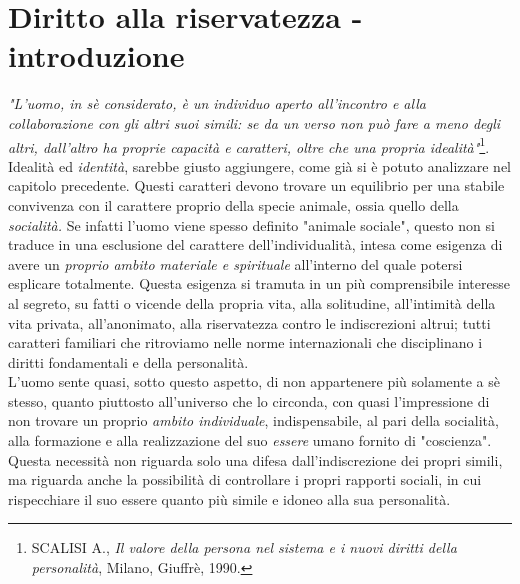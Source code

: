 


\section{Diritto alla riservatezza - introduzione}
\textit{"L'uomo, in sè considerato, è un individuo aperto all'incontro e alla collaborazione con gli altri suoi simili: se da un verso non può fare a meno degli altri, dall'altro ha proprie capacità e caratteri, oltre che una propria idealità"}\footnote{SCALISI A., \textit{Il valore della persona nel sistema e i nuovi diritti della personalità}, Milano, Giuffrè, 1990.}.
\\Idealità ed \textit{identità}, sarebbe giusto aggiungere, come già si è potuto analizzare nel capitolo precedente.
Questi caratteri devono trovare un equilibrio per una stabile convivenza con il carattere proprio della specie animale, ossia quello della \textit{socialità.} Se infatti l'uomo viene spesso definito "animale sociale", questo non si traduce in una esclusione del carattere dell'individualità, intesa come esigenza di avere un \textit{proprio ambito materiale e spirituale} all'interno del quale potersi esplicare totalmente.
Questa esigenza si tramuta in un più comprensibile interesse al segreto, su fatti o vicende della propria vita, alla solitudine, all'intimità della vita privata, all'anonimato, alla riservatezza contro le indiscrezioni altrui; tutti caratteri familiari che ritroviamo nelle norme internazionali che disciplinano i diritti fondamentali e della personalità.
\\L'uomo sente quasi, sotto questo aspetto, di non appartenere più solamente a sè stesso, quanto piuttosto all'universo che lo circonda, con quasi l'impressione di non trovare un proprio \textit{ambito individuale}, indispensabile, al pari della socialità, alla formazione e alla realizzazione del suo \textit{essere} umano fornito di "coscienza".
Questa necessità non riguarda solo una difesa dall'indiscrezione dei propri simili, ma riguarda anche la possibilità di controllare i propri rapporti sociali, in cui rispecchiare il suo essere quanto più simile e idoneo alla sua personalità.

